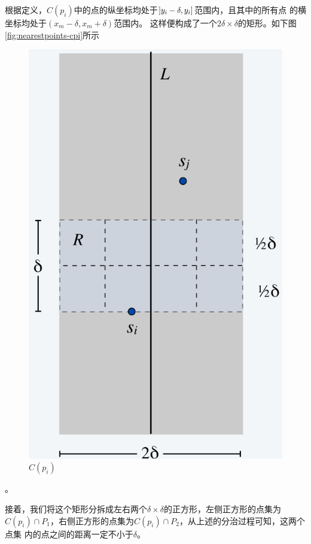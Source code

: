 根据定义，$C(p_i)$中的点的纵坐标均处于$\interval[open left]{y_i - \delta}{y_i}$范围内，且其中的所有点
的横坐标均处于$\left( x_m - \delta, x_m + \delta \right)$范围内。
这样便构成了一个$2\delta\times\delta$的矩形。如下图\autoref{fig:nearestpoints-cpi}所示
\begin{figure}[htb]
	\centering
	\includegraphics[scale=0.5]{image/NearestPointsCpi.png}
  \caption{$C(p_i)$}\label{fig:nearestpoints-cpi}
\end{figure}。

接着，我们将这个矩形分拆成左右两个$\delta \times \delta$的正方形，左侧正方形的点集为
$C(p_i)\cap P_1$，右侧正方形的点集为$C(p_i)\cap P_2$，从上述的分治过程可知，这两个点集
内的点之间的距离一定不小于$\delta$。

